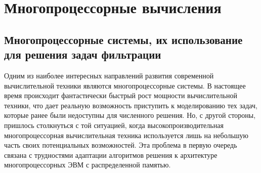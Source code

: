\section{Многопроцессорные вычисления}

\subsection{Многопроцессорные системы, их использование для решения задач
фильтрации}   
Одним из наиболее интересных направлений развития современной вычислительной
техники являются многопроцессорные системы. В настоящее время происходит фантастически
быстрый рост мощности
вычислительной техники, что дает реальную возможность
приступить к моделированию тех задач, которые ранее были недоступны для
численного решения. Но, с другой стороны, пришлось столкнуться с той ситуацией,
когда высокопроизводительная многопроцессорная вычислительная техника используется 
лишь на небольшую часть своих потенциальных возможностей. Эта проблема в первую очередь 
связана с трудностями адаптации алгоритмов решения к архитектуре многопроцессорных 
ЭВМ с распределенной памятью. 
 
